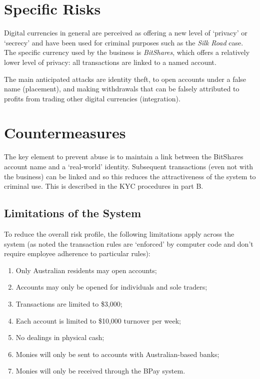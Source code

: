 \documentclass[12pt]{report}
\begin{document}
\section{Specific Risks}

Digital currencies in general are perceived as offering a new level of `privacy' or `secrecy' and have
been used for criminal purposes such as the \emph{Silk Road} case. The specific currency used
by the business is \emph{BitShares}, which offers a relatively lower level of privacy: all transactions
are linked to a named account.

The main anticipated attacks are identity theft, to open accounts under a false name (placement), and
making withdrawals that can be falsely attributed to profits from trading other digital currencies  (integration). 

\section{Countermeasures}

The key element to prevent abuse is to maintain a link between the BitShares account name and
a `real-world' identity. Subsequent transactions (even not with the business) can be linked
and so this reduces the attractiveness of the system to criminal use. This is described in the KYC procedures
in part B.

\subsection{Limitations of the System}

To reduce the overall risk profile, the following limitations apply across the system
(as noted the transaction rules are `enforced' by computer code and don't require employee adherence to
particular rules):
\begin{enumerate}
\item Only Australian residents may open accounts;
\item Accounts may only be opened for individuals and sole traders;
\item Transactions are limited to \$3,000;
\item Each account is limited to \$10,000 turnover per week;
\item No dealings in physical cash;
\item Monies will only be sent to accounts with Australian-based banks;
\item Monies will only be received through the BPay system.
\end{enumerate}
\end{document}
